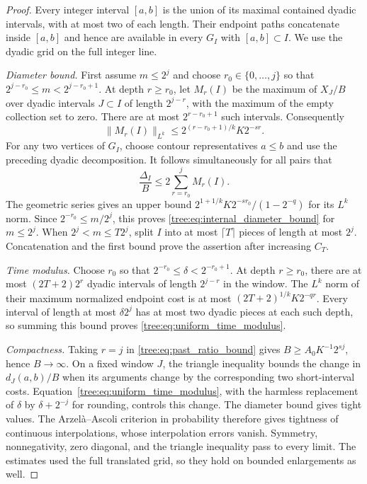 \begin{proof}
Every integer interval $[a,b]$ is the union of its maximal contained
dyadic intervals, with at most two of each length. Their endpoint paths
concatenate inside $[a,b]$ and hence are available in every $G_I$ with
$[a,b]\subset I$. We use the dyadic grid on the full integer line.

\emph{Diameter bound.} First assume $m\leq2^j$ and choose
$r_0\in\{0,\ldots,j\}$ so that
$2^{j-r_0}\leq m<2^{j-r_0+1}$. At depth $r\geq r_0$, let $M_r(I)$
be the maximum of $X_J/B$ over dyadic intervals $J\subset I$ of
length $2^{j-r}$, with the maximum of the empty collection set to
zero. There are at most $2^{r-r_0+1}$ such intervals. Consequently
\[
 \|M_r(I)\|_{L^k}
 \leq 2^{(r-r_0+1)/k}K2^{-sr}.
\]
For any two vertices of $G_I$, choose contour representatives
$a\leq b$ and use the preceding dyadic decomposition. It follows
simultaneously for all pairs that
\[
 \frac{\Delta_I}{B}\leq2\sum_{r=r_0}^j M_r(I).
\]
The geometric series gives an upper bound
$2^{1+1/k}K2^{-sr_0}/(1-2^{-q})$ for its $L^k$ norm. Since
$2^{-r_0}\leq m/2^j$, this proves
\eqref{tree:eq:internal_diameter_bound} for $m\leq2^j$. When
$2^j<m\leq T2^j$, split $I$ into at most $\lceil T\rceil$ pieces
of length at most $2^j$. Concatenation and the first bound prove
the assertion after increasing $C_T$.

\emph{Time modulus.} Choose $r_0$ so that
$2^{-r_0}\leq\delta<2^{-r_0+1}$. At depth $r\geq r_0$, there are
at most $(2T+2)2^r$ dyadic intervals of length $2^{j-r}$ in the
window. The $L^k$ norm of their maximum normalized endpoint cost is
at most $(2T+2)^{1/k}K2^{-qr}$. Every interval of length at most
$\delta2^j$ has at most two dyadic pieces at each such depth, so
summing this bound proves \eqref{tree:eq:uniform_time_modulus}.

\emph{Compactness.} Taking $r=j$ in \eqref{tree:eq:past_ratio_bound} gives
$B\geq A_0K^{-1}2^{sj}$, hence $B\to\infty$. On a fixed window
$J$, the triangle inequality bounds the change in $d_J(a,b)/B$
when its arguments change by the corresponding two short-interval
costs. Equation~\eqref{tree:eq:uniform_time_modulus}, with the harmless
replacement of $\delta$ by $\delta+2^{-j}$ for rounding, controls
this change. The diameter bound gives tight values. The
Arzel\`a--Ascoli criterion in probability therefore gives tightness
of continuous interpolations, whose interpolation errors vanish.
Symmetry, nonnegativity, zero diagonal, and the triangle inequality
pass to every limit. The estimates used the full translated grid,
so they hold on bounded enlargements as well.
\end{proof}

